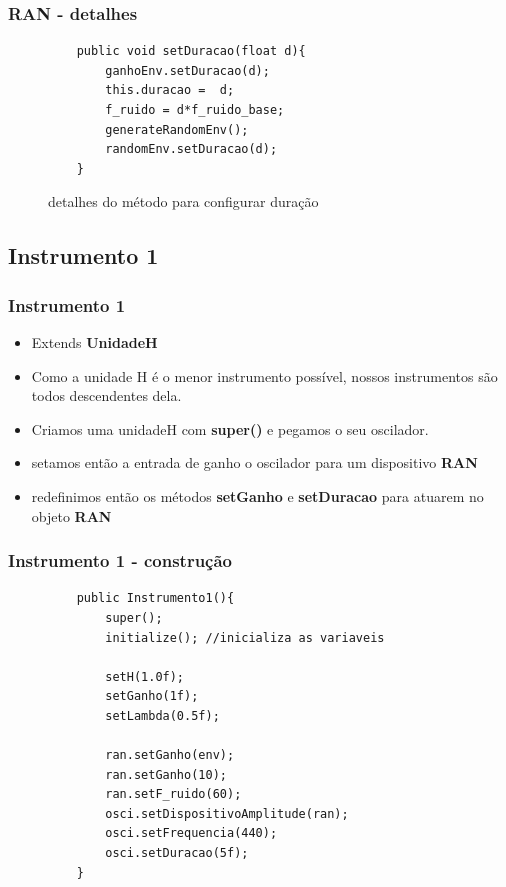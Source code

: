 \documentclass{beamer}
\begin{document}
 \begin{frame}[fragile]
 \frametitle{RAN - detalhes}
 \begin{figure}
 	\centering
 	\begin{lstlisting}
	public void setDuracao(float d){
		ganhoEnv.setDuracao(d);
		this.duracao =  d;
		f_ruido = d*f_ruido_base;
		generateRandomEnv();
		randomEnv.setDuracao(d);
	}
    			\end{lstlisting}
	\caption{detalhes do método para configurar duração}	
	\end{figure}
\end{frame}
\subsection{Instrumento 1}
\begin{frame}
 \frametitle{Instrumento 1}
 \begin{itemize}
 \item Extends \textbf{UnidadeH}
 \item Como a unidade H é o menor instrumento possível, nossos instrumentos são todos
 descendentes dela.
 \item Criamos uma unidadeH com \textbf{super()} e pegamos o seu oscilador.
 \item setamos então a entrada de ganho o oscilador para um dispositivo \textbf{RAN}
 \item redefinimos então os métodos \textbf{setGanho} e \textbf{setDuracao} para atuarem no objeto \textbf{RAN}
 \end{itemize}
\end{frame}

 \begin{frame}[fragile]
 \frametitle{Instrumento 1 - construção}
 \begin{figure}
 	\centering
 	\begin{lstlisting}
	public Instrumento1(){
		super();
		initialize(); //inicializa as variaveis

		setH(1.0f);
		setGanho(1f);
		setLambda(0.5f);
		
		ran.setGanho(env);
		ran.setGanho(10);
		ran.setF_ruido(60);
		osci.setDispositivoAmplitude(ran);
		osci.setFrequencia(440);
		osci.setDuracao(5f);
	}
    			\end{lstlisting}
	\caption*{}	
	\end{figure}
\end{frame}
\end{document}
